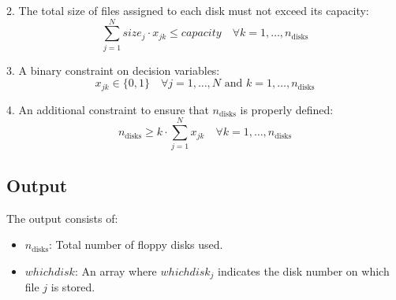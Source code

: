 \documentclass{article}
\begin{document}
2. The total size of files assigned to each disk must not exceed its capacity:
\[
\sum_{j=1}^{N} size_j \cdot x_{jk} \leq capacity \quad \forall k = 1, \ldots, n_{\text{disks}}
\]

3. A binary constraint on decision variables:
\[
x_{jk} \in \{0, 1\} \quad \forall j = 1, \ldots, N \text{ and } k = 1, \ldots, n_{\text{disks}}
\]

4. An additional constraint to ensure that $n_{\text{disks}}$ is properly defined:
\[
n_{\text{disks}} \geq k \cdot \sum_{j=1}^{N} x_{jk} \quad \forall k = 1, \ldots, n_{\text{disks}}
\]

\subsection*{Output}
The output consists of:
\begin{itemize}
    \item $n_{\text{disks}}$: Total number of floppy disks used.
    \item $whichdisk$: An array where $whichdisk_j$ indicates the disk number on which file $j$ is stored.
\end{itemize}
\end{document}
